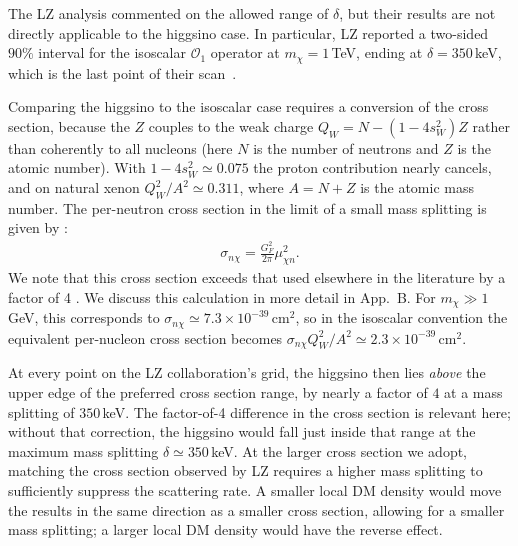 \documentclass[reprint,superscriptaddress,preprintnumbers,amsmath,amssymb,aps,prd,tightenlines,longbibliography,nofootinbib]{revtex4-2}
\begin{document}
The LZ analysis commented on the allowed range of $\delta$, but their results are not directly applicable to the higgsino case.
In particular, LZ reported a two-sided $90\%$ interval for the
isoscalar $\mathcal{O}_1$ operator at $m_\chi = 1$\,TeV, ending at $\delta = 350$\,keV, which is the last point of their scan~\cite{LZ:2026axp}. 

Comparing the higgsino to the isoscalar case requires a conversion of the cross section, because the $Z$ couples to the weak charge $Q_W = N - (1-4 s_W^2)Z$ rather than
coherently to all nucleons (here $N$ is the number of neutrons and $Z$ is the atomic number).
With $1-4s_W^2 \simeq 0.075$ the proton contribution
nearly cancels, and on natural xenon $Q_W^2/A^2 \simeq 0.311$, where $A=N+Z$ is the atomic mass number.
The per-neutron cross section in the limit of a small mass splitting is given by \cite{Essig:2007az}:
\begin{align}
\sigma_{n\chi} = \frac{G_F^2}{2\pi} \mu_{\chi n}^2.
\end{align}
We note that this cross section exceeds that used elsewhere in the literature by a factor of 4 \cite{Nagata:2014wma,Bramante:2016rdh}.
We discuss this calculation in more detail in App.~B.
For $m_\chi \gg 1$\,GeV, this corresponds to $\sigma_{n \chi} \simeq 7.3\times 10^{-39}$\,cm$^2$, so in the isoscalar convention the equivalent per-nucleon cross section becomes  $\sigma_{n\chi} Q_W^2/A^2 \simeq
2.3\times10^{-39}$\,cm$^2$. 

At every point on the LZ collaboration's grid,
the higgsino then lies {\it above} the upper edge of the preferred cross section range, by nearly a factor
of $4$ at a mass splitting of $350$\,keV. The factor-of-4 difference in the cross section is relevant here; without that correction, the higgsino would fall just inside that range at the maximum mass splitting $\delta \simeq 350$\,keV. 
At the larger cross section we adopt, matching the cross section observed by LZ requires a higher mass splitting to sufficiently suppress the scattering rate. A smaller local DM density would move the results in the same direction as a smaller cross section, allowing for a smaller mass splitting; a larger local DM density would have the reverse effect.
\end{document}
